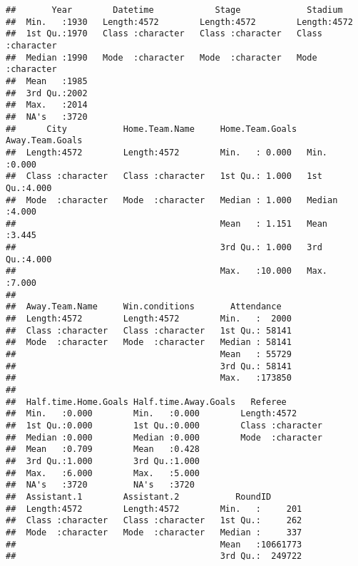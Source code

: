 \documentclass[]{article}
\begin{document}
\begin{verbatim}
##       Year        Datetime            Stage             Stadium         
##  Min.   :1930   Length:4572        Length:4572        Length:4572       
##  1st Qu.:1970   Class :character   Class :character   Class :character  
##  Median :1990   Mode  :character   Mode  :character   Mode  :character  
##  Mean   :1985                                                           
##  3rd Qu.:2002                                                           
##  Max.   :2014                                                           
##  NA's   :3720                                                           
##      City           Home.Team.Name     Home.Team.Goals  Away.Team.Goals
##  Length:4572        Length:4572        Min.   : 0.000   Min.   :0.000  
##  Class :character   Class :character   1st Qu.: 1.000   1st Qu.:4.000  
##  Mode  :character   Mode  :character   Median : 1.000   Median :4.000  
##                                        Mean   : 1.151   Mean   :3.445  
##                                        3rd Qu.: 1.000   3rd Qu.:4.000  
##                                        Max.   :10.000   Max.   :7.000  
##                                                                        
##  Away.Team.Name     Win.conditions       Attendance    
##  Length:4572        Length:4572        Min.   :  2000  
##  Class :character   Class :character   1st Qu.: 58141  
##  Mode  :character   Mode  :character   Median : 58141  
##                                        Mean   : 55729  
##                                        3rd Qu.: 58141  
##                                        Max.   :173850  
##                                                        
##  Half.time.Home.Goals Half.time.Away.Goals   Referee         
##  Min.   :0.000        Min.   :0.000        Length:4572       
##  1st Qu.:0.000        1st Qu.:0.000        Class :character  
##  Median :0.000        Median :0.000        Mode  :character  
##  Mean   :0.709        Mean   :0.428                          
##  3rd Qu.:1.000        3rd Qu.:1.000                          
##  Max.   :6.000        Max.   :5.000                          
##  NA's   :3720         NA's   :3720                           
##  Assistant.1        Assistant.2           RoundID        
##  Length:4572        Length:4572        Min.   :     201  
##  Class :character   Class :character   1st Qu.:     262  
##  Mode  :character   Mode  :character   Median :     337  
##                                        Mean   :10661773  
##                                        3rd Qu.:  249722  

\end{verbatim}
\end{document}
